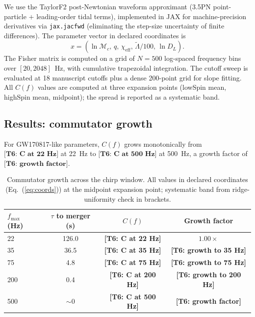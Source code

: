\documentclass[twocolumn,prd,showpacs,superscriptaddress]{revtex4-2}
\newcommand{\Mchirp}{\mathcal{M}_c}
\newcommand{\Lambdatilde}{\tilde{\Lambda}}
\newcommand{\chieff}{\chi_{\text{eff}}}
\newcommand{\Dl}{D_L}
\newcommand{\eqnref}[1]{Eq.~(\ref{eq:#1})}
\newcommand{\manifest}[1]{\textbf{[#1]}}
\begin{document}
We use the TaylorF2 post-Newtonian waveform approximant (3.5PN
point-particle $+$ leading-order tidal terms), implemented in JAX for
machine-precision derivatives via \texttt{jax.jacfwd} (eliminating the
step-size uncertainty of finite differences).  The parameter vector in
declared coordinates is
\begin{equation}
x = (\ln \Mchirp,\, q,\, \chieff,\, \Lambdatilde/100,\, \ln \Dl).
\label{eq:param}
\end{equation}
The Fisher matrix is computed on a grid of $N=500$ log-spaced frequency
bins over $[20, 2048]$~Hz, with cumulative trapezoidal integration.
The cutoff sweep is evaluated at 18 manuscript cutoffs plus a dense
200-point grid for slope fitting.  All $C(f)$ values are computed at
three expansion points (lowSpin mean, highSpin mean, midpoint); the
spread is reported as a systematic band.

\subsection{Results: commutator growth}

For GW170817-like parameters, $C(f)$ grows monotonically from
$\manifest{T6: C at 22 Hz}$ at 22~Hz to
$\manifest{T6: C at 500 Hz}$ at 500~Hz, a growth factor of
$\manifest{T6: growth factor}$.

\begin{table}[tp]
\centering
\renewcommand{\arraystretch}{1.2}
\caption{Commutator growth across the chirp window.  All values in
declared coordinates (\eqnref{coords}) at the midpoint expansion point;
systematic band from ridge-uniformity check in brackets.}
\label{tab:commutator_growth}
\begin{tabular}{lccc}
\toprule
$f_{\text{max}}$ (Hz) & $\tau$ to merger (s) & $C(f)$ & Growth factor \\
\midrule
22  & 126.0 & \manifest{T6: C at 22 Hz}   & $1.00\times$ \\
35  &  36.5 & \manifest{T6: C at 35 Hz}   & \manifest{T6: growth to 35 Hz} \\
75  &   4.8 & \manifest{T6: C at 75 Hz}   & \manifest{T6: growth to 75 Hz} \\
200 &   0.4 & \manifest{T6: C at 200 Hz}  & \manifest{T6: growth to 200 Hz} \\
500 &  $\sim0$ & \manifest{T6: C at 500 Hz} & \manifest{T6: growth factor} \\
\bottomrule
\end{tabular}
\end{table}
\end{document}
